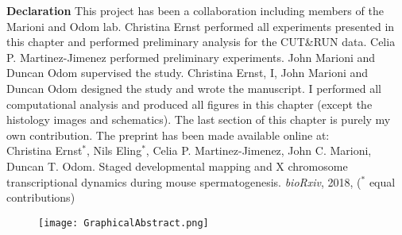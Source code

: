 \newpage

\vspace*{\fill}

\begin{Comment}
\textbf{Declaration} This project has been a collaboration including members of the Marioni and Odom lab. Christina Ernst performed all experiments presented in this chapter and performed preliminary analysis for the CUT\&{}RUN data. Celia P. Martinez-Jimenez performed preliminary experiments. John Marioni and Duncan Odom supervised the study. Christina Ernst, I, John Marioni and Duncan Odom designed the study and wrote the manuscript. I performed all computational analysis and produced all figures in this chapter (except the histology images and schematics). The last section of this chapter is purely my own contribution. The preprint has been made available online at:\\

Christina Ernst$^\ast$, Nils Eling$^\ast$, Celia P. Martinez-Jimenez, John C. Marioni, Duncan T. Odom. Staged developmental mapping and X chromosome transcriptional dynamics during mouse spermatogenesis. \emph{bioRxiv}, 2018, ($^\ast$ equal contributions)
\end{Comment}

\vspace*{\fill}

\begin{figure}[hb]
\centering    
\texttt{[image: GraphicalAbstract.png]}
\caption*{}
\end{figure}

\vspace*{\fill}


\newpage


\newpage

\newpage


